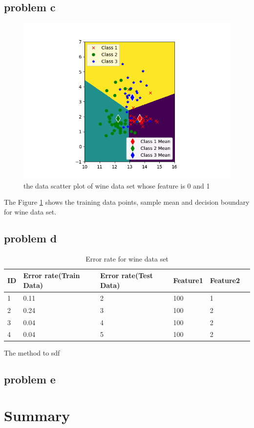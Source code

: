 \documentclass{article}
\begin{document}
	\subsection{problem c}
		\begin{figure}[hbt!]
		\includegraphics[width=\linewidth]{images/wine_feature01_train.png}	
		\caption{the data scatter plot of wine data set whose feature is 0 and 1}
		\label{fig:wine_feature01_train}
	\end{figure} 
	The Figure \ref{fig:wine_feature01_train} shows the training data points, sample mean and decision boundary for wine data set. 
	\subsection{problem d}
		\begin{table}[hbt!]
		\begin{center}
			\begin{tabular}{| l | l | l | l | l | p{5cm} |}
				\hline
				ID     & Error rate(Train Data) & Error rate(Test Data) & Feature1 & Feature2   \\ \hline
				1      & 0.11     &    2   & 100      &   1         \\      \hline
				2      & 0.24	  &	    3  & 100      &    2        \\      \hline
				3      & 0.04     &      4 & 100      &     2       \\      \hline
				4      & 0.04	  &	      5& 100      &      2      \\      \hline
			\end{tabular}
		\end{center}
		\caption{Error rate for wine data set}
		\label{table: errorrate}
	\end{table}
	The method to sdf
	\subsection{problem e}
	\section{Summary}
	
\end{document}
